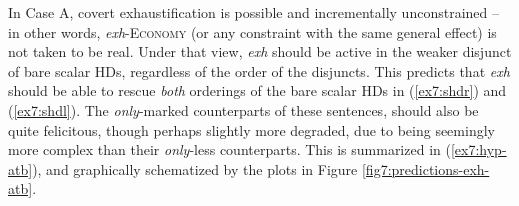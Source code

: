 In Case A, covert exhaustification is possible and incrementally unconstrained -- in other words, \textit{exh}-\textsc{Economy} (or any constraint with the same general effect) is not taken to be real. Under that view, \textit{exh} should be active in the weaker disjunct of bare scalar HDs, regardless of the order of the disjuncts. This predicts that \textit{exh} should be able to rescue \textit{both} orderings of the bare scalar HDs in (\ref{ex7:shdr}) and (\ref{ex7:shdl}). The \textit{only}-marked counterparts of these sentences, should also be quite felicitous, though perhaps slightly more degraded, due to being seemingly more complex than their \textit{only}-less counterparts. This is summarized in (\ref{ex7:hyp-atb}), and graphically schematized by the plots in Figure \ref{fig7:predictions-exh-atb}.
\begin{exe}
	\label{ex7:hyp-atb}
\end{exe}
